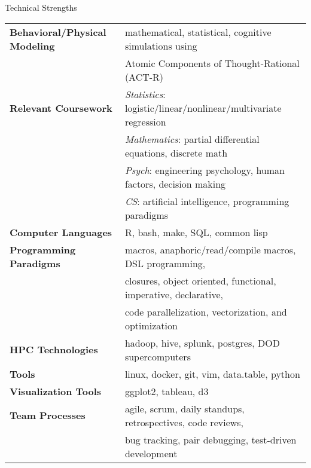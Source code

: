 

\begin{rSection}{Technical Strengths}
  \begin{tabular}{ @{} >{\bfseries}l @{\hspace{4ex}} l }
    Behavioral/Physical Modeling &	mathematical, statistical, cognitive simulations using \\
    &					Atomic Components of Thought-Rational (ACT-R) \\
    [.13cm]
    Relevant Coursework &		\emph{Statistics}: logistic/linear/nonlinear/multivariate regression \\
    &					\emph{Mathematics}: partial differential equations, discrete math \\
    &					\emph{Psych}: engineering psychology, human factors, decision making \\ 
    &					\emph{CS}: artificial intelligence, programming paradigms \\
    [.13cm]
    Computer Languages &		R, bash, make, SQL, common lisp \\
    [.13cm]
    Programming Paradigms &		macros, anaphoric/read/compile macros, DSL programming, \\
    & 					closures, object oriented, functional, imperative, declarative, \\
    &					code parallelization, vectorization, and optimization \\
    [.13cm]
    HPC Technologies &			hadoop, hive, splunk, postgres, DOD supercomputers \\
    [.13cm]
    Tools & 				linux, docker, git, vim, data.table, python \\
    [.13cm]
    Visualization Tools &		ggplot2, tableau, d3 \\
    [.13cm]
    Team Processes & 			agile, scrum, daily standups, retrospectives, code reviews, \\
    & 					bug tracking, pair debugging, test-driven development \\
  \end{tabular}
\end{rSection}

